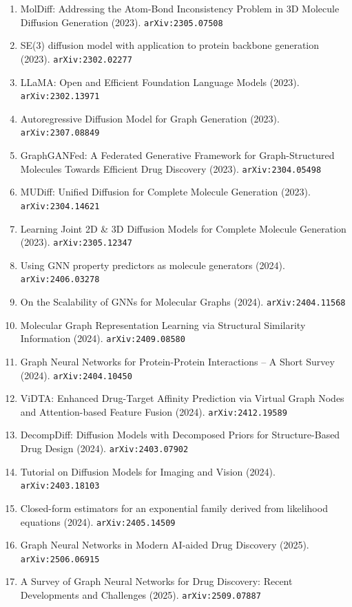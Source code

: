 \documentclass[11pt]{article}
\begin{document}
\begin{enumerate}
  Affinity Prediction (2023). \texttt{arXiv:2303.03543}
  \item MolDiff: Addressing the Atom-Bond Inconsistency Problem in 3D Molecule
  Diffusion Generation (2023). \texttt{arXiv:2305.07508}
  \item SE(3) diffusion model with application to protein backbone generation (2023). \texttt{arXiv:2302.02277}
  \item LLaMA: Open and Efficient Foundation Language Models (2023). \texttt{arXiv:2302.13971}
  \item Autoregressive Diffusion Model for Graph Generation (2023). \texttt{arXiv:2307.08849}
  \item GraphGANFed: A Federated Generative Framework for Graph-Structured
  Molecules Towards Efficient Drug Discovery (2023). \texttt{arXiv:2304.05498}
  \item MUDiff: Unified Diffusion for Complete Molecule Generation (2023). \texttt{arXiv:2304.14621}
  \item Learning Joint 2D \& 3D Diffusion Models for Complete Molecule Generation (2023). \texttt{arXiv:2305.12347}
  \item Using GNN property predictors as molecule generators (2024). \texttt{arXiv:2406.03278}
  \item On the Scalability of GNNs for Molecular Graphs (2024). \texttt{arXiv:2404.11568}
  \item Molecular Graph Representation Learning via Structural Similarity
  Information (2024). \texttt{arXiv:2409.08580}
  \item Graph Neural Networks for Protein-Protein Interactions -- A Short Survey (2024). \texttt{arXiv:2404.10450}
  \item ViDTA: Enhanced Drug-Target Affinity Prediction via Virtual Graph Nodes
  and Attention-based Feature Fusion (2024). \texttt{arXiv:2412.19589}
  \item DecompDiff: Diffusion Models with Decomposed Priors for Structure-Based
  Drug Design (2024). \texttt{arXiv:2403.07902}
  \item Tutorial on Diffusion Models for Imaging and Vision (2024). \texttt{arXiv:2403.18103}
  \item Closed-form estimators for an exponential family derived from likelihood
  equations (2024). \texttt{arXiv:2405.14509}
  \item Graph Neural Networks in Modern AI-aided Drug Discovery (2025). \texttt{arXiv:2506.06915}
  \item A Survey of Graph Neural Networks for Drug Discovery: Recent Developments and Challenges (2025). \texttt{arXiv:2509.07887}

\end{enumerate}
\end{document}
